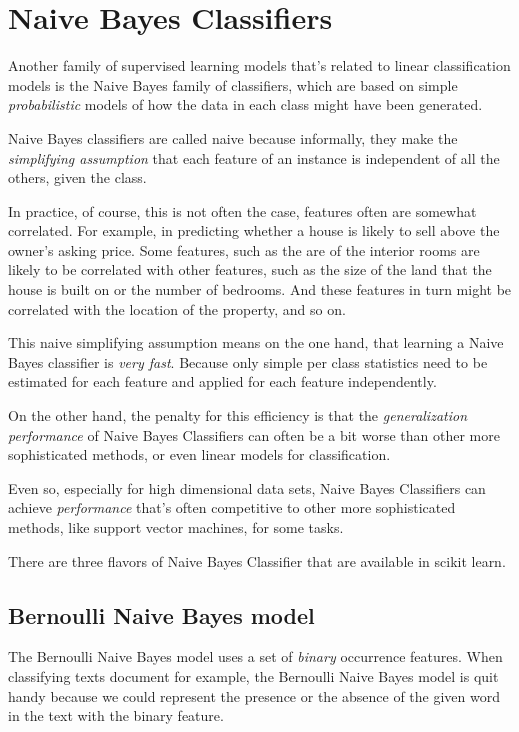 \section{Naive Bayes Classifiers}
\begin{multicols}{2}

Another family of supervised learning models that's related to linear classification models is the Naive Bayes family of classifiers, which are based on simple \emph{probabilistic} models of how the data in each class might have been generated. 

Naive Bayes classifiers are called naive because informally, they make the \emph{simplifying assumption} that each feature of an instance is independent of all the others, given the class. 

In practice, of course, this is not often the case, features often are somewhat correlated. For example, in predicting whether a house is likely to sell above the owner's asking price. Some features, such as the are of the interior rooms are likely to be correlated with other features, such as the size of the land that the house is built on or the number of bedrooms. And these features in turn might be correlated with the location of the property, and so on. 

This naive simplifying assumption means on the one hand, that learning a Naive Bayes classifier is \emph{very fast}. Because only simple per class statistics need to be estimated for each feature and applied for each feature independently. 

On the other hand, the penalty for this efficiency is that the \emph{generalization performance} of Naive Bayes Classifiers can often be a bit worse than other more sophisticated methods, or even linear models for classification. 

Even so, especially for high dimensional data sets, Naive Bayes Classifiers can achieve \emph{performance} that's often competitive to other more sophisticated methods, like support vector machines, for some tasks. 

There are three flavors of Naive Bayes Classifier that are available in scikit learn.

\subsection{Bernoulli Naive Bayes model}

The Bernoulli Naive Bayes model uses a set of \emph{binary} occurrence features. When classifying texts document for example, the Bernoulli Naive Bayes model is quit handy because we could represent the presence or the absence of the given word in the text with the binary feature. 


\end{multicols}
